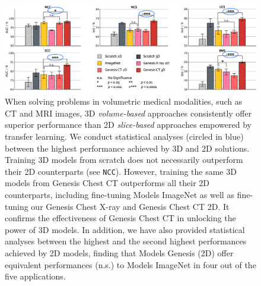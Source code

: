 \begin{figure}
\centering
\includegraphics[width=1.0\columnwidth]{Figures/CH5/fig_3d_vs_2d.pdf}
\caption[Models Genesis Top Any 2D Approaches]{
When solving problems in volumetric medical modalities, such as CT and MRI images, 3D \textit{volume-based} approaches consistently offer superior performance than 2D \textit{slice-based} approaches empowered by transfer learning. We conduct statistical analyses (circled in blue) between the highest performance achieved by 3D and 2D solutions. Training 3D models from scratch does not necessarily outperform their 2D counterparts (see \texttt{NCC}). However, training the same 3D models from Genesis Chest CT outperforms all their 2D counterparts, including fine-tuning Models ImageNet as well as fine-tuning our Genesis Chest X-ray and Genesis Chest CT 2D. It confirms the effectiveness of Genesis Chest CT in unlocking the power of 3D models. In addition, we have also provided statistical analyses between the highest and the second highest performances achieved by 2D models, finding that Models Genesis (2D) offer equivalent performances (n.s.) to Models ImageNet in four out of the five applications.
}
\label{ch5:fig:2D_3D_target_tasks}
\end{figure}




